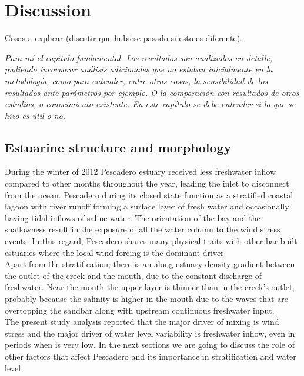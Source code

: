 \documentclass[tesis.tex]{subfiles}
\begin{document}
    
\section{Discussion}

Cosas a explicar (discutir que hubiese pasado si esto es diferente).

\textit{Para mí el capitulo fundamental. Los resultados son analizados en detalle, pudiendo incorporar análisis adicionales que no estaban inicialmente en la metodología, como para entender, entre otras cosas, la sensibilidad de los resultados ante parámetros por ejemplo. O la comparación con resultados de otros estudios, o conocimiento existente. En este capítulo se debe entender si lo que se hizo es útil o no.}

\subsection{Estuarine structure and morphology}

During the winter of 2012 Pescadero estuary received less freshwater inflow compared to other months throughout the year, leading the inlet to disconnect from the ocean. Pescadero during its closed state function as a stratified coastal lagoon with river runoff forming a surface layer of fresh water and occasionally having tidal inflows of saline water. The orientation of the bay and the shallowness result in the exposure of all the water column to the wind stress events. In this regard, Pescadero shares many physical traits with other bar-built estuaries where the local wind forcing is the dominant driver.\\

Apart from the stratification, there is an along-estuary density gradient between the outlet of the creek and the mouth, due to the constant discharge of freshwater. Near the mouth the upper layer is thinner than in the creek's outlet, probably because the salinity is higher in the mouth due to the waves that are overtopping the sandbar along with upstream continuous freshwater input.\\

The present study analysis reported that the major driver of mixing is wind stress and the major driver of water level variability is freshwater inflow, even in periods when is very low. In the next sections we are going to discuss the role of other factors that affect Pescadero and its importance in stratification and water level.\\
\end{document}
